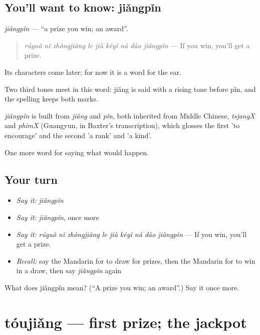 \subsection*{You'll want to know: jiǎngpǐn}
\emph{jiǎngpǐn} — \textquotedblleft{}a prize you win; an award\textquotedblright{}.

\begin{quote}
\emph{rúguǒ nǐ zhòngjiǎng le jiù kěyǐ ná dào jiǎngpǐn} — If you win, you'll get a prize.
\end{quote}

Its characters come later; for now it is a word for the ear.

Two third tones meet in this word: jiǎng is said with a rising tone before pǐn, and the spelling keeps both marks.

\begin{cousinweb}
\emph{jiǎngpǐn} is built from \emph{jiǎng} and \emph{pǐn}, both inherited from Middle Chinese, \emph{tsjangX} and \emph{phimX} (Guangyun, in Baxter's transcription), which glosses the first 'to encourage' and the second 'a rank' and 'a kind'.
\end{cousinweb}

\begin{grammarlens}[title={What you've built}]
One more word for saying what would happen.
\end{grammarlens}

\subsection*{Your turn}
\begin{itemize}
\raggedright
  \item \emph{Say it:} \emph{jiǎngpǐn}
  \item \emph{Say it:} \emph{jiǎngpǐn}, once more
  \item \emph{Say it:} \emph{rúguǒ nǐ zhòngjiǎng le jiù kěyǐ ná dào jiǎngpǐn} — If you win, you'll get a prize.
  \item \emph{Recall:} say the Mandarin for to draw for prizes, then the Mandarin for to win in a draw, then say \emph{jiǎngpǐn} again
\end{itemize}

\begin{tcolorbox}[breakable,colback=teal!4,colframe=teal!35!black,title={Before you move on}]
What does jiǎngpǐn mean? (\textquotedblleft{}A prize you win; an award\textquotedblright{}.) Say it once more.
\end{tcolorbox}
\section[tóujiǎng]{tóujiǎng — first prize; the jackpot}

